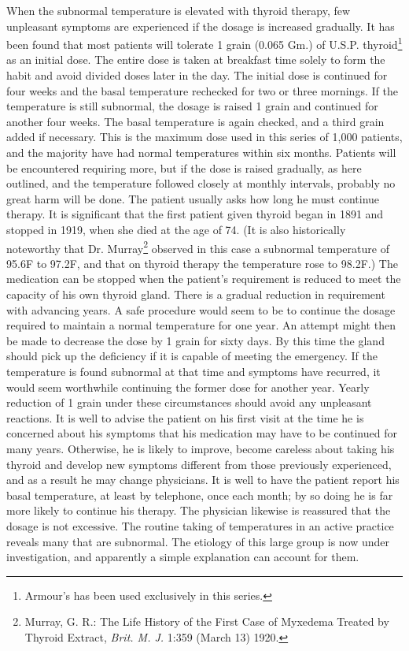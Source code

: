 \documentclass[10pt, letterpaper]{memoir}
\begin{document}
\begin{multicols}{2}
When the subnormal temperature is elevated with thyroid therapy, few unpleasant symptoms are experienced if the dosage is increased gradually. It has been found that most patients will tolerate 1 grain (0.065 Gm.) of U.S.P. thyroid\footnote{Armour's has been used exclusively in this series.} as an initial dose. The entire dose is taken at breakfast time solely to form the habit and avoid divided doses later in the day. The initial dose is continued for four weeks and the basal temperature rechecked for two or three mornings. If the temperature is still subnormal, the dosage is raised 1 grain and continued for another four weeks. The basal temperature is again checked, and a third grain added if necessary. This is the maximum dose used in this series of 1,000 patients, and the majority have had normal temperatures within six months. Patients will be encountered requiring more, but if the dose is raised gradually, as here outlined, and the temperature followed closely at monthly intervals, probably no great harm will be done. The patient usually asks how long he must continue therapy. It is significant that the first patient given thyroid began in 1891 and stopped in 1919, when she died at the age of 74. (It is also historically noteworthy that Dr. Murray\footnote{Murray, G. R.: The Life History of the First Case of Myxedema Treated by Thyroid Extract, \textit{Brit. M. J.} 1:359 (March 13) 1920.} observed in this case a subnormal temperature of 95.6\textdegree{}F to 97.2\textdegree{}F, and that on thyroid therapy the temperature rose to 98.2\textdegree{}F.) The medication can be stopped when the patient's requirement is reduced to meet the capacity of his own thyroid gland. There is a gradual reduction in requirement with advancing years. A safe procedure would seem to be to continue the dosage required to maintain a normal temperature for one year. An attempt might then be made to decrease the dose by 1 grain for sixty days. By this time the gland should pick up the deficiency if it is capable of meeting the emergency. If the temperature is found subnormal at that time and symptoms have recurred, it would seem worthwhile continuing the former dose for another year. Yearly reduction of 1 grain under these circumstances should avoid any unpleasant reactions. It is well to advise the patient on his first visit at the time he is concerned about his symptoms that his medication may have to be continued for many years. Otherwise, he is likely to improve, become careless about taking his thyroid and develop new symptoms different from those previously experienced, and as a result he may change physicians. It is well to have the patient report his basal temperature, at least by telephone, once each month; by so doing he is far more likely to continue his therapy. The physician likewise is reassured that the dosage is not excessive. The routine taking of temperatures in an active practice reveals many that are subnormal. The etiology of this large group is now under investigation, and apparently a simple explanation can account for them.


\end{multicols}
\end{document}
